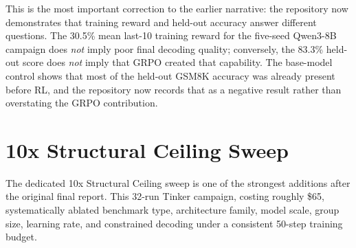This is the most important correction to the earlier narrative: the repository
now demonstrates that training reward and held-out accuracy answer different
questions. The 30.5\% mean last-10 training reward for the five-seed Qwen3-8B
campaign does \emph{not} imply poor final decoding quality; conversely, the
83.3\% held-out score does \emph{not} imply that GRPO created that capability.
The base-model control shows that most of the held-out GSM8K accuracy was
already present before RL, and the repository now records that as a negative
result rather than overstating the GRPO contribution.

\section*{10x Structural Ceiling Sweep}

The dedicated 10x Structural Ceiling sweep is one of the strongest additions
after the original final report. This 32-run Tinker campaign, costing roughly
\$65, systematically ablated benchmark type, architecture family, model scale,
group size, learning rate, and constrained decoding under a consistent 50-step
training budget.

